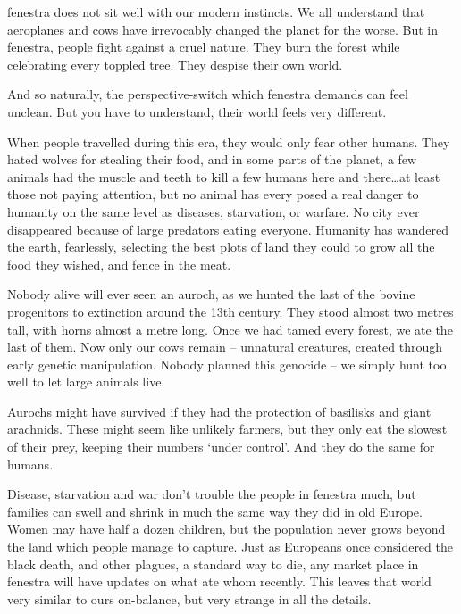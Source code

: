 \begin{multicols}{2}

\noindent
\Gls{fenestra} does not sit well with our modern instincts.
We all understand that aeroplanes and cows have irrevocably changed the planet for the worse.
But in \gls{fenestra}, people fight against a cruel nature.
They burn the forest while celebrating every toppled tree.
They despise their own world.

And so naturally, the perspective-switch which \gls{fenestra} demands can feel unclean.
But you have to understand, their world feels very different.

When people travelled during this era, they would only fear other humans.
They hated wolves for stealing their food, and in some parts of the planet, a few animals had the muscle and teeth to kill a few humans here and there\ldots at least those not paying attention, but no animal has every posed a real danger to humanity on the same level as diseases, starvation, or warfare.
No city ever disappeared because of large predators eating everyone.
Humanity has wandered the earth, fearlessly, selecting the best plots of land they could to grow all the food they wished, and fence in the meat.

Nobody alive will ever seen an auroch, as we hunted the last of the bovine progenitors to extinction around the 13th century.
They stood almost two metres tall, with horns almost a metre long.
Once we had tamed every forest, we ate the last of them.
Now only our cows remain -- unnatural creatures, created through early genetic manipulation.
Nobody planned this genocide -- we simply hunt too well to let large animals live.

Aurochs might have survived if they had the protection of basilisks and giant arachnids.
These might seem like unlikely farmers, but they only eat the slowest of their prey, keeping their numbers `under control'.
And they do the same for humans.

Disease, starvation and war don't trouble the people in \gls{fenestra} much, but families can swell and shrink in much the same way they did in old Europe.
Women may have half a dozen children, but the population never grows beyond the land which people manage to capture.
Just as Europeans once considered the black death, and other plagues, a standard way to die, any market place in \gls{fenestra} will have updates on what ate whom recently.
This leaves that world very similar to ours on-balance, but very strange in all the details.


\end{multicols}
